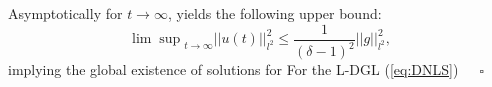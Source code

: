 \documentclass[preprintnumbers,amsmath,amssymb]{revtex4}
\begin{document}
Asymptotically for $t\rightarrow \infty$, yields the following upper bound:
\begin{equation}
 {\lim\sup}_{t \rightarrow \infty} || u(t)||_{l^2}^2\le \frac{1}{(\delta-1)^2}|| g||_{l^2}^2,
\end{equation}
implying the global existence of solutions for For the L-DGL (\ref{eq:DNLS})\ \ \ $\square$
\vspace*{0.5cm}
%
\end{document}
